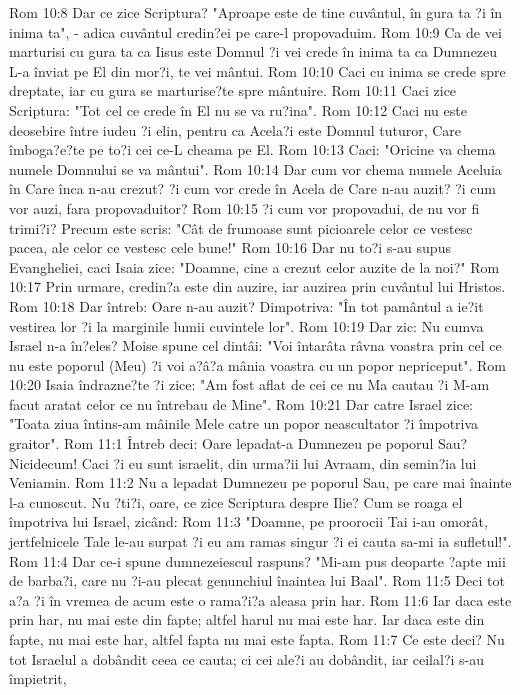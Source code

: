 Rom 10:8  Dar ce zice Scriptura? "Aproape este de tine cuvântul, în gura ta ?i în inima ta", - adica cuvântul credin?ei pe care-l propovaduim.
Rom 10:9  Ca de vei marturisi cu gura ta ca Iisus este Domnul ?i vei crede în inima ta ca Dumnezeu L-a înviat pe El din mor?i, te vei mântui.
Rom 10:10  Caci cu inima se crede spre dreptate, iar cu gura se marturise?te spre mântuire.
Rom 10:11  Caci zice Scriptura: "Tot cel ce crede în El nu se va ru?ina".
Rom 10:12  Caci nu este deosebire între iudeu ?i elin, pentru ca Acela?i este Domnul tuturor, Care îmboga?e?te pe to?i cei ce-L cheama pe El.
Rom 10:13  Caci: "Oricine va chema numele Domnului se va mântui".
Rom 10:14  Dar cum vor chema numele Aceluia în Care înca n-au crezut? ?i cum vor crede în Acela de Care n-au auzit? ?i cum vor auzi, fara propovaduitor?
Rom 10:15  ?i cum vor propovadui, de nu vor fi trimi?i? Precum este scris: "Cât de frumoase sunt picioarele celor ce vestesc pacea, ale celor ce vestesc cele bune!"
Rom 10:16  Dar nu to?i s-au supus Evangheliei, caci Isaia zice: "Doamne, cine a crezut celor auzite de la noi?"
Rom 10:17  Prin urmare, credin?a este din auzire, iar auzirea prin cuvântul lui Hristos.
Rom 10:18  Dar întreb: Oare n-au auzit? Dimpotriva: "În tot pamântul a ie?it vestirea lor ?i la marginile lumii cuvintele lor".
Rom 10:19  Dar zic: Nu cumva Israel n-a în?eles? Moise spune cel dintâi: "Voi întarâta râvna voastra prin cel ce nu este poporul (Meu) ?i voi a?â?a mânia voastra cu un popor nepriceput".
Rom 10:20  Isaia îndrazne?te ?i zice: "Am fost aflat de cei ce nu Ma cautau ?i M-am facut aratat celor ce nu întrebau de Mine".
Rom 10:21  Dar catre Israel zice: "Toata ziua întins-am mâinile Mele catre un popor neascultator ?i împotriva graitor".
Rom 11:1  Întreb deci: Oare lepadat-a Dumnezeu pe poporul Sau? Nicidecum! Caci ?i eu sunt israelit, din urma?ii lui Avraam, din semin?ia lui Veniamin.
Rom 11:2  Nu a lepadat Dumnezeu pe poporul Sau, pe care mai înainte l-a cunoscut. Nu ?ti?i, oare, ce zice Scriptura despre Ilie? Cum se roaga el împotriva lui Israel, zicând:
Rom 11:3  "Doamne, pe proorocii Tai i-au omorât, jertfelnicele Tale le-au surpat ?i eu am ramas singur ?i ei cauta sa-mi ia sufletul!".
Rom 11:4  Dar ce-i spune dumnezeiescul raspuns? "Mi-am pus deoparte ?apte mii de barba?i, care nu ?i-au plecat genunchiul înaintea lui Baal".
Rom 11:5  Deci tot a?a ?i în vremea de acum este o rama?i?a aleasa prin har.
Rom 11:6  Iar daca este prin har, nu mai este din fapte; altfel harul nu mai este har. Iar daca este din fapte, nu mai este har, altfel fapta nu mai este fapta.
Rom 11:7  Ce este deci? Nu tot Israelul a dobândit ceea ce cauta; ci cei ale?i au dobândit, iar ceilal?i s-au împietrit,
